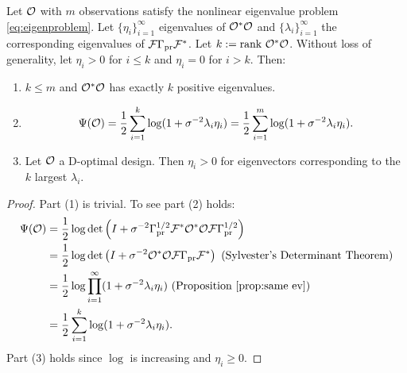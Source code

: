 \begin{proposition}\label{prop:true target}
  Let $\mathcal{O}$ with $m$ observations satisfy the nonlinear eigenvalue
  problem \eqref{eq:eigenproblem}. Let $\{\eta_i\}_{i=1}^{\infty}$
  eigenvalues of $\mathcal{O}^*\mathcal{O}$ and $\{\lambda_i\}_{i=1}^{\infty}$ the
  corresponding eigenvalues of $\mathcal{F} \Gamma_{\textup{pr}} \mathcal{F}^*$. Let $k:=\textup{rank}\ 
  \mathcal{O}^*\mathcal{O}$. Without loss of generality, let $\eta_i > 0$ for $i\leq
  k$ and $\eta_i = 0$ for $i > k$. Then:
  \begin{enumerate}
    \item $k \leq m$ and $\mathcal{O}^*\mathcal{O}$ has exactly $k$ positive
      eigenvalues.
    \item
      \begin{equation*}
        \tar(\obs) = \frac12 \sum_{i=1}^{k} \log (1 + \sigma^{-2}\lambda_i\eta_i) = \frac12 \sum_{i=1}^{m} \log (1 + \sigma^{-2}\lambda_i\eta_i).
      \end{equation*}
    \item Let $\mathcal{O}$ a D-optimal design. Then $\eta_i > 0$ for
      eigenvectors corresponding to the $k$ largest $\lambda_i$.
  \end{enumerate}
\end{proposition}
\begin{proof}
  Part (1) is trivial. To see part (2) holds: 
  \begin{align}
    \begin{split}
      \tar(\obs) &= \frac12\log \det \left (I + \sigma^{-2} \prcov^{1/2} \fwd ^* \obs^*
      \obs \fwd \prcov^{1/2}\right )\\%
      &= \frac12 \log \det \left (I + \sigma^{-2} \obs^* \obs \fwd
      \prcov\fwd^* \right ) \text{ (Sylvester's Determinant
      Theorem)}\\
      &=\frac12 \log \prod_{i=1}^{\infty} ( 1 + \sigma^{-2} \lambda_i\eta_i ) \text{ (Proposition \ref{prop:same ev})} \\
      &=\frac12 \sum_{i=1}^{k} \log (1 + \sigma^{-2}\lambda_i\eta_i). 
    \end{split}
  \end{align}
  Part (3) holds since $\log$ is increasing and $\eta_i \geq 0$.
\end{proof}


